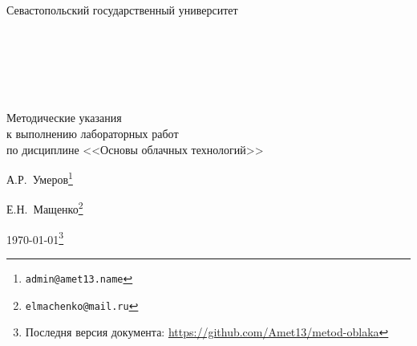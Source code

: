 
\begin{center}

\Large{Севастопольский государственный университет}

{~}\bigskip %

{~}\bigskip

{~}\bigskip

\Huge{Методические указания \\
к выполнению лабораторных работ \\
по дисциплине <<Основы облачных технологий>>} %

\vspace{1em}

\Large{А.Р.~Умеров}\footnote{\texttt{admin@amet13.name}} %

\Large{Е.Н.~Мащенко}\footnote{\texttt{elmachenko@mail.ru}} %

\Large{\today}\footnote{Последня версия документа: \url{https://github.com/Amet13/metod-oblaka}} %

\end{center}

\clearpage %

